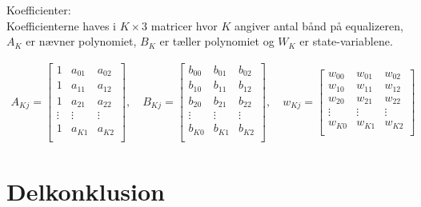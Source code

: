    



   Koefficienter:\\
   Koefficienterne haves i $K \times 3$ matricer hvor $K$ angiver antal bånd på equalizeren,
    $A_K$ er nævner polynomiet, $B_K$ er tæller polynomiet
   og $W_K$ er state-variablene.  


   \begin{align}
   A_{Kj} = \left[\begin{matrix}
   1 			& a_{01} 	& a_{02} \\
   1 			& a_{11} 	& a_{12} \\
   1 			& a_{21} 	& a_{22} \\
   \vdots 		& \vdots 	&  \vdots \\
   1 			& a_{K1} 	& a_{K2} \\
   \end{matrix}
   \right], \quad
      B_{Kj} = \left[\begin{matrix}
   b_{00}		& b_{01} 	& b_{02} \\
   b_{10}		& b_{11} 	& b_{12} \\
   b_{20}		& b_{21} 	& b_{22} \\
   \vdots 		& \vdots 	&  \vdots \\
   b_{K0}		& b_{K1} 	& b_{K2} \\
   \end{matrix}
   \right], \quad
      w_{Kj} = \left[\begin{matrix}
   w_{00}		& w_{01} 	& w_{02} \\
   w_{10}		& w_{11} 	& w_{12} \\
   w_{20}		& w_{21} 	& w_{22} \\
   \vdots 		& \vdots 	&  \vdots \\
   w_{K0}		& w_{K1} 	& w_{K2} \\
   \end{matrix}
   \right]
   \end{align}
\section{Delkonklusion}

